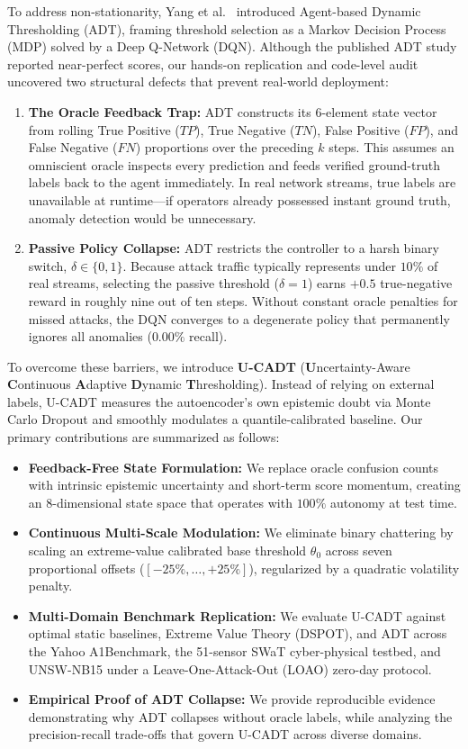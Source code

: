 \documentclass[conference]{IEEEtran}
\begin{document}
To address non-stationarity, Yang et al.~\cite{yang2023adt} introduced Agent-based Dynamic Thresholding (ADT), framing threshold selection as a Markov Decision Process (MDP) solved by a Deep Q-Network (DQN). Although the published ADT study reported near-perfect scores, our hands-on replication and code-level audit uncovered two structural defects that prevent real-world deployment:
\begin{enumerate}
    \item \textbf{The Oracle Feedback Trap:} ADT constructs its 6-element state vector from rolling True Positive ($TP$), True Negative ($TN$), False Positive ($FP$), and False Negative ($FN$) proportions over the preceding $k$ steps. This assumes an omniscient oracle inspects every prediction and feeds verified ground-truth labels back to the agent immediately. In real network streams, true labels are unavailable at runtime—if operators already possessed instant ground truth, anomaly detection would be unnecessary.
    \item \textbf{Passive Policy Collapse:} ADT restricts the controller to a harsh binary switch, $\delta \in \{0, 1\}$. Because attack traffic typically represents under $10\%$ of real streams, selecting the passive threshold ($\delta = 1$) earns $+0.5$ true-negative reward in roughly nine out of ten steps. Without constant oracle penalties for missed attacks, the DQN converges to a degenerate policy that permanently ignores all anomalies ($0.00\%$ recall).
\end{enumerate}

To overcome these barriers, we introduce \textbf{U-CADT} (\textbf{U}ncertainty-Aware \textbf{C}ontinuous \textbf{A}daptive \textbf{D}ynamic \textbf{T}hresholding). Instead of relying on external labels, U-CADT measures the autoencoder's own epistemic doubt via Monte Carlo Dropout and smoothly modulates a quantile-calibrated baseline. Our primary contributions are summarized as follows:
\begin{itemize}
    \item \textbf{Feedback-Free State Formulation:} We replace oracle confusion counts with intrinsic epistemic uncertainty and short-term score momentum, creating an 8-dimensional state space that operates with $100\%$ autonomy at test time.
    \item \textbf{Continuous Multi-Scale Modulation:} We eliminate binary chattering by scaling an extreme-value calibrated base threshold $\theta_0$ across seven proportional offsets ($[-25\%, \dots, +25\%]$), regularized by a quadratic volatility penalty.
    \item \textbf{Multi-Domain Benchmark Replication:} We evaluate U-CADT against optimal static baselines, Extreme Value Theory (DSPOT), and ADT across the Yahoo A1Benchmark, the 51-sensor SWaT cyber-physical testbed, and UNSW-NB15 under a Leave-One-Attack-Out (LOAO) zero-day protocol.
    \item \textbf{Empirical Proof of ADT Collapse:} We provide reproducible evidence demonstrating why ADT collapses without oracle labels, while analyzing the precision-recall trade-offs that govern U-CADT across diverse domains.
\end{itemize}
\end{document}
